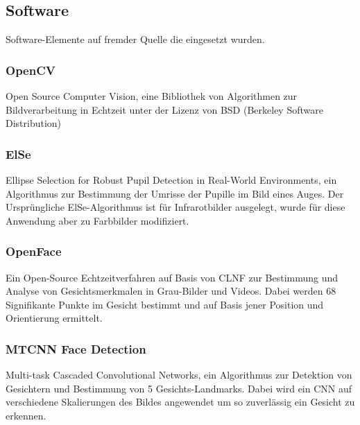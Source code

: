 \subsection{Software}
Software-Elemente auf fremder Quelle die eingesetzt wurden.
\subsubsection{OpenCV}
Open Source Computer Vision, eine Bibliothek von Algorithmen zur Bildverarbeitung in Echtzeit unter der Lizenz von BSD (Berkeley
Software Distribution)
\subsubsection{ElSe}
Ellipse Selection for Robust Pupil Detection in Real-World Environments, ein Algorithmus zur Bestimmung der Umrisse der Pupille im Bild eines Auges. Der Ursprüngliche ElSe-Algorithmus ist für Infrarotbilder ausgelegt, wurde für diese Anwendung aber zu Farbbilder modifiziert.
\subsubsection{OpenFace}
Ein Open-Source Echtzeitverfahren auf Basis von CLNF zur Bestimmung und Analyse von Gesichtsmerkmalen in Grau-Bilder und Videos. Dabei werden 68 Signifikante Punkte im Gesicht bestimmt und auf Basis jener Position und Orientierung ermittelt.
\subsubsection{MTCNN Face Detection}
Multi-task Cascaded Convolutional Networks, ein Algorithmus zur Detektion von Gesichtern und Bestimmung von 5 Gesichts-Landmarks. Dabei wird ein CNN auf verschiedene Skalierungen des Bildes angewendet um so zuverlässig ein Gesicht zu erkennen.